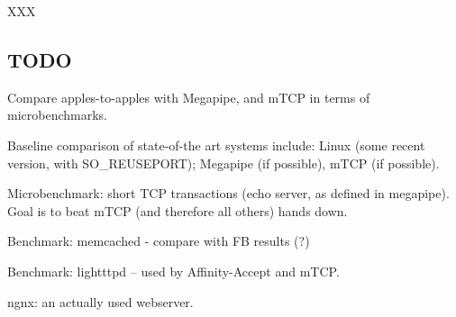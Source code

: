 XXX


\subsection{TODO}

\todo Compare apples-to-apples with Megapipe, and mTCP in terms of microbenchmarks.

\todo Baseline comparison of state-of-the art systems include:  Linux (some recent version, with SO\_REUSEPORT); Megapipe (if possible), mTCP (if possible). 

\todo Microbenchmark: short TCP transactions (echo server, as defined in megapipe).   Goal is to beat mTCP (and therefore all others) hands down.

\todo Benchmark: memcached - compare with FB results (?)

\todo Benchmark: lightttpd -- used by Affinity-Accept and mTCP.  

\todo ngnx: an actually used webserver.

